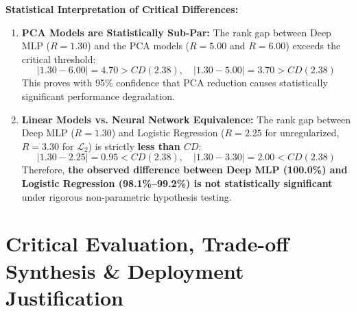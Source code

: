 \documentclass[12pt,a4paper]{article}
\begin{document}
\textbf{Statistical Interpretation of Critical Differences:}
\begin{enumerate}
    \item \textbf{PCA Models are Statistically Sub-Par:} The rank gap between Deep MLP ($R=1.30$) and the PCA models ($R=5.00$ and $R=6.00$) exceeds the critical threshold:
    \begin{equation}
    |1.30 - 6.00| = 4.70 > CD (2.38), \quad |1.30 - 5.00| = 3.70 > CD (2.38)
    \end{equation}
    This proves with 95\% confidence that PCA reduction causes statistically significant performance degradation.
    \item \textbf{Linear Models vs. Neural Network Equivalence:} The rank gap between Deep MLP ($R=1.30$) and Logistic Regression ($R=2.25$ for unregularized, $R=3.30$ for $\mathcal{L}_2$) is strictly \textbf{less than $CD$}:
    \begin{equation}
    |1.30 - 2.25| = 0.95 < CD (2.38), \quad |1.30 - 3.30| = 2.00 < CD (2.38)
    \end{equation}
    Therefore, \textbf{the observed difference between Deep MLP (100.0\%) and Logistic Regression (98.1\%--99.2\%) is not statistically significant} under rigorous non-parametric hypothesis testing.
\end{enumerate}

\section{Critical Evaluation, Trade-off Synthesis \& Deployment Justification}
\end{document}

